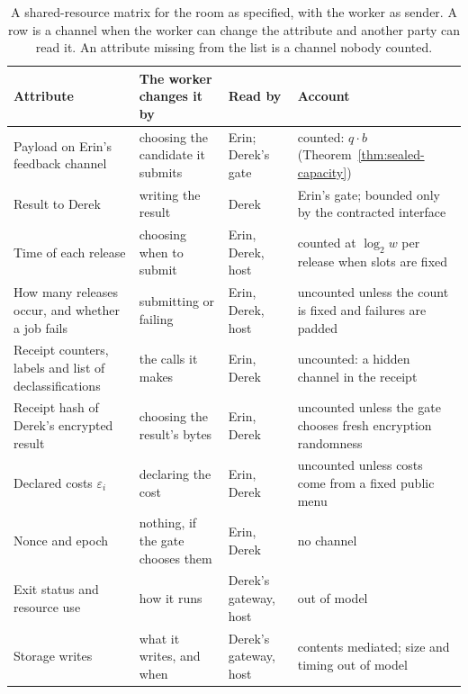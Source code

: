 \documentclass[11pt,a4paper]{article}
\theoremstyle{definition}
\begin{document}
\begin{table}[H]\centering\footnotesize
\caption{A shared-resource matrix for the room as specified, with the worker
as sender. A row is a channel when the worker can change the attribute and
another party can read it. An attribute missing from the list is a channel
nobody counted.}
\label{tab:sealed-shared-resources}
\setlength{\tabcolsep}{4pt}
\begin{tabularx}{\textwidth}{@{}>{\raggedright\arraybackslash}p{} >{\raggedright\arraybackslash}X >{\raggedright\arraybackslash}p{} >{\raggedright\arraybackslash}p{}@{}}
\toprule
Attribute & The worker changes it by & Read by & Account \\
\midrule
Payload on Erin's feedback channel & choosing the candidate it submits & Erin; Derek's gate & counted: $q\cdot b$ (Theorem~\ref{thm:sealed-capacity}) \\
Result to Derek & writing the result & Derek & Erin's gate; bounded only by the contracted interface \\
Time of each release & choosing when to submit & Erin, Derek, host & counted at $\log_2 w$ per release when slots are fixed \\
How many releases occur, and whether a job fails & submitting or failing & Erin, Derek, host & uncounted unless the count is fixed and failures are padded \\
Receipt counters, labels and list of declassifications & the calls it makes & Erin, Derek & uncounted: a hidden channel in the receipt \\
Receipt hash of Derek's encrypted result & choosing the result's bytes & Erin, Derek & uncounted unless the gate chooses fresh encryption randomness \\
Declared costs $\varepsilon_i$ & declaring the cost & Erin, Derek & uncounted unless costs come from a fixed public menu \\
Nonce and epoch & nothing, if the gate chooses them & Erin, Derek & no channel \\
Exit status and resource use & how it runs & Derek's gateway, host & out of model \\
Storage writes & what it writes, and when & Derek's gateway, host & contents mediated; size and timing out of model \\
\bottomrule
\end{tabularx}
\end{table}
\end{document}
